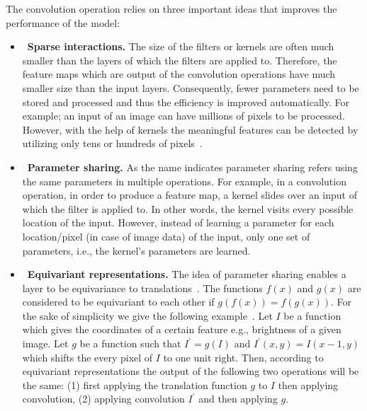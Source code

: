 The convolution operation relies on three important ideas that improves the performance of the model:\\
\begin{itemize}
\item \ \textbf{Sparse interactions.} The size of the filters or kernels are often much smaller than the layers of which the filters are applied to. Therefore, the feature maps which are output of the convolution operations have much smaller size than the input layers. Consequently, fewer parameters need to be stored and processed and thus the efficiency is improved automatically. For example; an input of an image can have millions of pixels to be processed. However, with the help of kernels the meaningful features can be detected by utilizing only tens or hundreds of pixels~\cite{goodfellow2016deep}.\\
\item \ \textbf{Parameter sharing.}
As the name indicates parameter sharing refers using the same parameters in multiple operations. For example,  in a convolution operation, in order to produce a feature map, a kernel slides over an input of which the filter is applied to. In other words, the kernel visits every possible location of the input. However, instead of learning a parameter for each location/pixel (in case of image data) of the input, only one set of parameters, i.e., the kernel's parameters are learned.\\ %
\item \ \textbf{Equivariant representations.} The idea of parameter sharing enables a layer to be equivariance to translations~\cite{goodfellow2016deep}. The functions $f(x)$ and $g(x)$ are considered to be equivariant to each other if  $g(f(x)) = f(g(x))$. For the sake of simplicity we give the following example~\cite{goodfellow2016deep}. Let $I$ be a function which gives the coordinates of a certain feature e.g., brightness of a given image. Let $g$ be a function such that $I^{'} = g(I)$ and $I^{'}(x,y)=I(x-1,y)$ which shifts the every pixel of $I$ to one unit right. Then, according to equivariant representations the output of the following two operations will be the same: (1) first applying the translation function $g$ to $I$ then applying convolution, (2) applying convolution $I^'$ and then applying $g$. 
\end{itemize}

